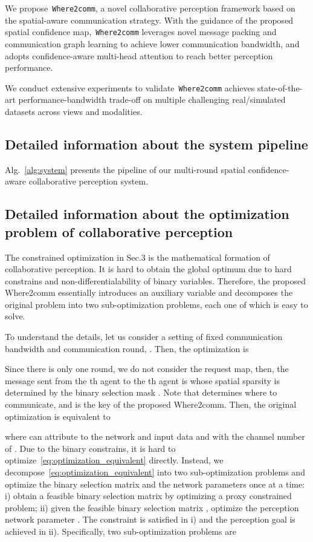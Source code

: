 \documentclass{article}
\begin{document}
 We propose~\texttt{Where2comm}, a novel collaborative perception framework based on the spatial-aware communication strategy. With the guidance of the proposed spatial confidence map,~\texttt{Where2comm} leverages novel message packing and communication graph learning to  achieve lower communication bandwidth, and adopts confidence-aware multi-head attention to reach better perception performance.

 We conduct extensive experiments to validate~\texttt{Where2comm} achieves state-of-the-art performance-bandwidth trade-off on multiple challenging real/simulated datasets across views and modalities. 


\subsection{Detailed information about the system pipeline}
Alg.~\ref{alg:system} presents the pipeline of our multi-round spatial confidence-aware collaborative perception system.


\subsection{Detailed information about the optimization problem of collaborative perception}
The constrained optimization in Sec.3 is the mathematical formation of collaborative perception. It is hard to obtain the global optimum due to hard constrains and non-differentialability of binary variables. Therefore, the proposed Where2comm essentially introduces an auxiliary variable and decomposes the original problem into two sub-optimization problems, each one of which is easy to solve.

To understand the details, let us consider a setting of fixed communication bandwidth and communication round, . Then, the optimization is
\vspace{-1mm}

Since there is only one round, we do not consider the request map, then, the message sent from the th agent to the th agent is 
 whose spatial sparsity is determined by the binary selection mask . Note that  determines where to communicate, and is the key of the proposed Where2comm. Then, the original optimization is equivalent to 

where  can attribute to the network  and input data  and  with  the channel number of . Due to the binary constrains, it is hard to optimize~\eqref{eq:optimization_equivalent} directly. Instead, we decompose~\eqref{eq:optimization_equivalent} into two sub-optimization problems and optimize the binary selection matrix   and the network parameters  once at a time: i) obtain a feasible binary selection matrix  by optimizing a proxy constrained problem; ii) given the feasible binary selection matrix , optimize the perception network parameter . The constraint is satisfied in i) and the perception goal is achieved in ii). Specifically, two sub-optimization problems are
\end{document}
